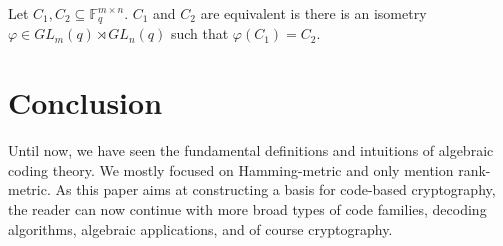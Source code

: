 \begin{definition}
Let $C_1, C_2 \subseteq \mathbb{F}_q^{m \times n}$. $C_1$ and $C_2$ are equivalent is there is an isometry $\varphi\in GL_m(q) \rtimes GL_n(q)$ such that $\varphi(C_1) = C_2$.
\end{definition}

\section{Conclusion}
Until now, we have seen the fundamental definitions and intuitions of algebraic coding theory. We mostly focused on Hamming-metric and only mention rank-metric. As this paper aims at constructing a basis for code-based cryptography, the reader can now continue with more broad types of code families, decoding algorithms, algebraic applications, and of course cryptography.